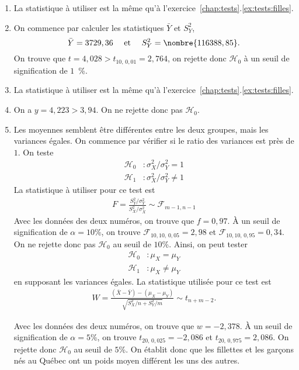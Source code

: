 \begin{solution}{6.6}
   \begin{enumerate}
    \item La statistique à utiliser est la même qu'à l'exercice~\ref{chap:tests}.\ref{ex:tests:filles}.
    \item On commence par calculer les statistiques $\bar{Y}$ et $S_Y^2$,
   $$
   \bar{Y} = 3729,36 \quad \mbox{ et } \quad S_Y^2 = \nombre{116388,85}.
   $$
   On trouve que $t = 4,028 > t_{10, \,0,01} = 2,764$, on rejette donc $ \mathcal{H}_0$ à un seuil de signification de $1$~\%.
    \item La statistique à utiliser est la même qu'à l'exercice~\ref{chap:tests}.\ref{ex:tests:filles}.
    \item On a $y = 4,223 > 3,94$. On ne rejette donc pas $ \mathcal{H}_0$.
    \item Les moyennes semblent être différentes entre les deux groupes, mais les variances égales. On commence par vérifier si le ratio des variances est près de $1$. On teste
       \begin{align*}
         \mathcal{H}_0 &: \sigma_X^2 / \sigma_Y^2 = 1 \\
         \mathcal{H}_1 &: \sigma_X^2 / \sigma_Y^2 \ne 1
      \end{align*}
      La statistique à utiliser pour ce test est
      \begin{align*}
      F = \frac{S_Y^2 / \sigma_Y^2}{S_X^2 / \sigma_X^2} \sim \mathcal{F}_{m-1, n-1}
      \end{align*}
      Avec les données des deux numéros, on trouve que $f = 0,97$. À un seuil de signification de $\alpha = 10$\%, on trouve $\mathcal{F}_{10, 10, \, 0,05} = 2,98$ et $\mathcal{F}_{10, 10, \, 0,95} = 0,34$. On ne rejette donc pas $\mathcal{H}_0$ au seuil de $10$\%. Ainsi, on peut tester
      \begin{align*}
         \mathcal{H}_0 &: \mu_X = \mu_Y \\
         \mathcal{H}_1 &: \mu_X \ne \mu_Y
      \end{align*}
en supposant les variances égales. La statistique utilisée pour ce test est
\begin{align*}
W = \frac{(\bar{X} - \bar{Y}) - (\mu_X - \mu_Y)}{\sqrt{S_X^2/n+S_Y^2/m}} \sim t_{n+m-2}.
\end{align*}

Avec les données des deux numéros, on trouve que $w = -2,378$. À un seuil de signification de $\alpha = 5$\%, on trouve $t_{20, \, 0,025} = -2,086$ et $t_{20, \, 0,975} = 2,086$. On rejette donc $\mathcal{H}_0$ au seuil de $5$\%. On établit donc que les fillettes et les garçons nés au Québec ont un poids moyen différent les uns des autres.
    \end{enumerate}
  
\end{solution}
